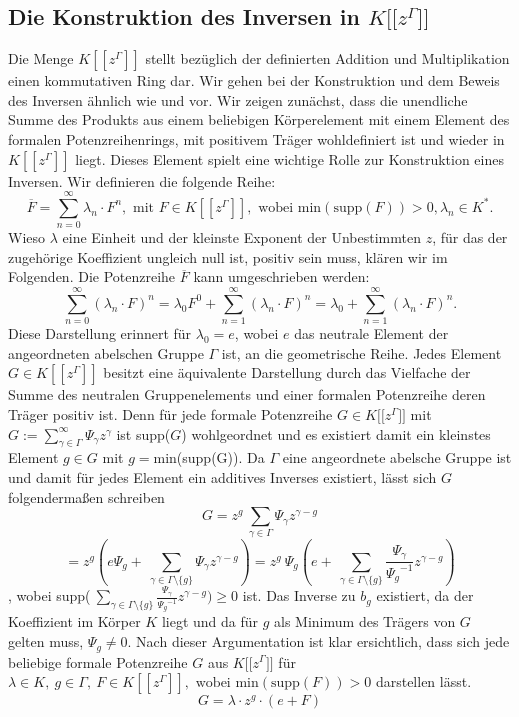 \subsection{Die Konstruktion des Inversen in $K\lbrack\lbrack z^{\Gamma}\rbrack\rbrack$ }
Die Menge $K[[z^\Gamma]]$ stellt bezüglich der definierten Addition und Multiplikation einen kommutativen Ring dar. Wir gehen bei der Konstruktion und dem Beweis des Inversen ähnlich wie \cite[S. 196- 198]{fuchs66} und \cite[S. 210- 213]{neumann49} vor.
Wir zeigen zunächst, dass die unendliche Summe des Produkts aus einem beliebigen Körperelement mit einem Element des formalen Potenzreihenrings, mit positivem Träger wohldefiniert ist und wieder in $K[[z^\Gamma]]$ liegt. Dieses Element spielt eine wichtige Rolle zur Konstruktion eines Inversen. Wir definieren die folgende Reihe:
\[\overline{F} = \sum_{n=0}^{\infty}\lambda_n\cdot F^n, \text{ mit } F \in K[[z^{\Gamma}]], \text{ wobei } \text{min}\left(\text{supp}\left(F\right)\right) > 0, \lambda_n \in K^*. \]
Wieso $\lambda$ eine Einheit und der kleinste Exponent der Unbestimmten $z$, für das der zugehörige Koeffizient ungleich null ist, positiv sein muss, klären wir im Folgenden. Die Potenzreihe $\overline{F}$ kann umgeschrieben werden:
\[\sum_{n=0}^{\infty}\left(\lambda_n\cdot F\right)^n = \lambda_0 F^0 + \sum_{n=1}^{\infty}\left(\lambda_n\cdot F\right)^n = \lambda_0 + \sum_{n=1}^{\infty}\left(\lambda_n\cdot F\right)^n.\] 
Diese Darstellung erinnert für $\lambda_0 = e$, wobei $e$ das neutrale Element der angeordneten abelschen Gruppe $\Gamma$ ist, an die geometrische Reihe. Jedes Element $G \in K[[z^\Gamma]]$ besitzt eine äquivalente Darstellung durch das Vielfache der Summe des neutralen Gruppenelements und einer formalen Potenzreihe deren Träger positiv ist. Denn für jede formale Potenzreihe $G \in K\lbrack\lbrack z^\Gamma\rbrack\rbrack$ mit $G:= \sum_{\gamma \in \Gamma}^{\infty}\Psi_\gamma z^\gamma$ ist supp($G$) wohlgeordnet und es existiert damit ein kleinstes Element $g\in G$ mit $g=$min(supp(G)). Da $\Gamma$ eine angeordnete abelsche Gruppe ist und damit für jedes Element ein additives Inverses existiert, lässt sich $G$ folgendermaßen schreiben
\[G= z^g ~\sum_{\gamma \in \Gamma} \Psi_{\gamma} z^{\gamma-g}\]
\[= z^g \left( e \Psi_g + ~\sum_{\gamma \in \Gamma\setminus \lbrace g \rbrace} \Psi_{\gamma} z^{\gamma-g}\right) = z^g ~ \Psi_g \left(e + ~\sum_{\gamma \in \Gamma\setminus \lbrace g \rbrace} \frac{\Psi_{\gamma}}{{\Psi_g}^{-1}} z^{\gamma-g}\right)\]
, wobei supp($~\sum_{\gamma \in \Gamma\setminus \lbrace g \rbrace} \frac{\Psi_{\gamma}}{{\Psi_g}^{-1}} z^{\gamma-g}) \ge 0$ ist.
Das Inverse zu $b_g$ existiert, da der Koeffizient im Körper $K$ liegt und da für $g$ als Minimum des Trägers von $G$ gelten muss, $\Psi_g \neq 0$. 
Nach dieser Argumentation ist klar ersichtlich, dass sich jede beliebige formale Potenzreihe $G$ aus $K\lbrack\lbrack z^\Gamma\rbrack\rbrack$ für $\lambda \in K, ~g \in\Gamma,~F \in K[[z^{\Gamma}]], \text{ wobei } \text{min}\left(\text{supp}\left(F\right)\right) > 0$ darstellen lässt.
\[G = \lambda\cdot z^g\cdot \left(e + F\right)\] 

